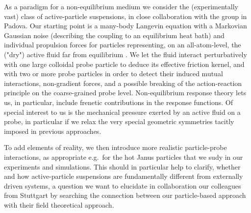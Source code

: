\begin{workpackage}[id=WPactive,wphases=0-48,
  short=Active Particle Suspensions,%
  title=Probing Active Particle Suspensions with Colloids and Polymers,
  lead=Leipzig,
  LeipzigRM=12]
\begin{tasklist}
\begin{task}[title=Non-Equilibrium Equations of State (NEOS),id=task1,PM=15,lead=Leipzig,wphases=0-30!0.5]
As a paradigm for a non-equilibrium medium we consider the (experimentally vast) class of
active-particle suspensions, in close collaboration with the group in Padova.
%
Our starting point is a many-body Langevin equation with a Markovian Gaussian noise
(describing the coupling to an equilibrium heat bath) and individual propulsion forces for
particles representing, on an all-atom-level, the ("dry") active fluid far from equilibrium \cite{solon-etal.2015}. 
%
We let the fluid interact perturbatively with one large colloidal probe particle to
deduce its effective friction kernel, and with two or more probe particles in order to
detect their induced mutual interactions, non-gradient forces, and a possible breaking of
the action-reaction principle on the coarse-grained probe level.  
%
Non-equilibrium response theory lets us, in particular, include frenetic contributions in the response functions.
%
Of special interest to us is the mechanical pressure exerted by an active fluid on a probe, 
in particular if we relax the very special geometric symmetries tacitly imposed in previous approaches.

To add elements of reality, we then introduce more realistic particle-probe interactions, as appropriate e.g.\ for the hot 
Janus particles that we sudy in our experiments and simulations.
%
This should in particular help to clarify, whether and how active-particle suspensions are fundamentally different
from externally driven systems, a question we want to elucidate in collaboration our colleagues from Stuttgart 
by searching the connection between our particle-based approach with their field theoretical approach.

\end{task}


\end{tasklist}
\end{workpackage}
